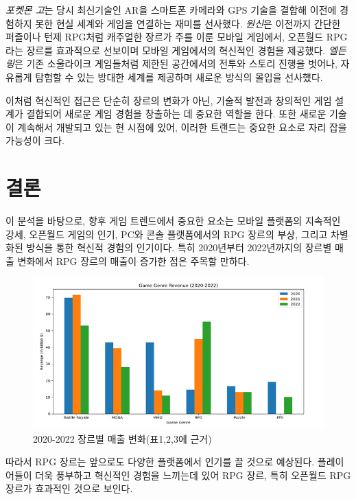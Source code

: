 \documentclass[a4paper, 11pt]{article}
\begin{document}
\begin{enumerate}[label=\arabic*.]
    \textit{포켓몬 고}는 당시 최신기술인 AR을 스마트폰 카메라와 GPS 기술을 결합해 이전에 경험하지 못한 현실 세계와 게임을 연결하는 재미를 선사했다. \textit{원신}은 이전까지 간단한 퍼즐이나 턴제 RPG처럼 캐주얼한 장르가 주를 이룬 모바일 게임에서, 오픈월드 RPG라는 장르를 효과적으로 선보이며 모바일 게임에서의 혁신적인 경험을 제공했다. \textit{엘든 링}은 기존 소울라이크 게임들처럼 제한된 공간에서의 전투와 스토리 진행을 벗어나, 자유롭게 탐험할 수 있는 방대한 세계를 제공하며 새로운 방식의 몰입을 선사했다. 
    
    이처럼 혁신적인 접근은 단순히 장르의 변화가 아닌, 기술적 발전과 창의적인 게임 설계가 결합되어 새로운 게임 경험을 창출하는 데 중요한 역할을 한다. 또한 새로운 기술이 계속해서 개발되고 있는 현 시점에 있어, 이러한 트랜드는 중요한 요소로 자리 잡을 가능성이 크다.
\end{enumerate}

\section{결론}
이 분석을 바탕으로, 향후 게임 트렌드에서 중요한 요소는 모바일 플랫폼의 지속적인 강세, 오픈월드 게임의 인기, PC와 콘솔 플랫폼에서의 RPG 장르의 부상, 그리고 차별화된 방식을 통한 혁신적 경험의 인기이다. 특히 2020년부터 2022년까지의 장르별 매출 변화에서 RPG 장르의 매출이 증가한 점은 주목할 만하다.

\begin{figure}[h!]
    \centering
    \includegraphics[width=\textwidth]{resource/sales_change__graph.png}
    \caption{2020-2022 장르별 매출 변화(표1,2,3에 근거)}
    \label{sales change according to game genre from 2020 to 2022}
\end{figure}

따라서 RPG 장르는 앞으로도 다양한 플랫폼에서 인기를 끌 것으로 예상된다. 플레이어들이 더욱 풍부하고 혁신적인 경험을 느끼는데 있어 RPG 장르, 특히 오픈월드 RPG 장르가 효과적인 것으로 보인다.



\end{document}
